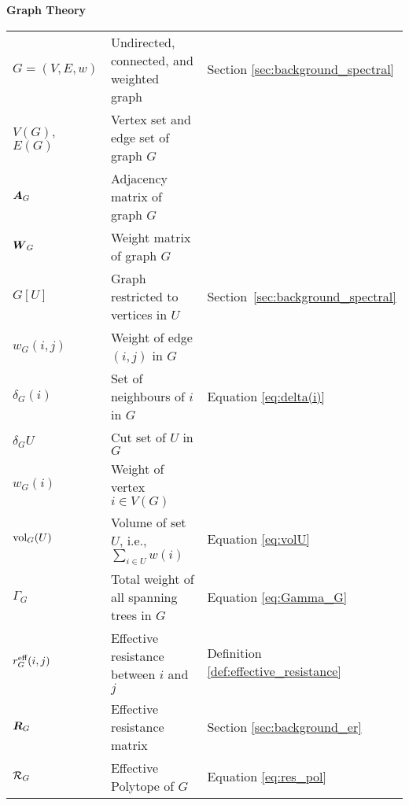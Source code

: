 \noindent \textbf{Graph Theory}\\
\vspace{\headingsep}
\begin{longtable}{p{\colwidth}p{\descsep}l}
	$G=(V,E,w)$ & Undirected, connected, and weighted graph & Section \ref{sec:background_spectral}\\
	$V(G)$, $E(G)$ & Vertex set and edge set of graph $G$\\
	$\vb*{A}_G$ & {Adjacency matrix of graph $G$}\\
	{$\vb*{W}_G$} & {Weight matrix of graph $G$}\\
	$G[U]$ & Graph restricted to vertices in $U$  & Section~\ref{sec:background_spectral}\\
	$w_G(i,j)$ & Weight of edge $(i,j)$ in $G$ \\
	$\delta_G(i)$ & Set of neighbours of $i$ in $G$ & Equation \eqref{eq:delta(i)}\\
	$\delta_G U$ & Cut set of $U$ in $G$ \\
	$w_G(i)$ & Weight of vertex $i\in V(G)$\\
	$\textnormal{vol}_G(U)$ & Volume of set $U$, i.e., $\sum_{i\in U}w(i)$ & Equation \eqref{eq:volU}\\
	$\Gamma_G$ & Total weight of all spanning trees in $G$ & Equation \eqref{eq:Gamma_G} \\
	$r^{\text{eff}}_G(i,j)$  & Effective resistance between $i$ and $j$ & Definition \ref{def:effective_resistance}\\
	$\vb*{R}_G$  & Effective resistance matrix & Section \ref{sec:background_er}\\
	$\mathcal{R}_G$ & Effective Polytope of $G$ & Equation \eqref{eq:res_pol}
\end{longtable}
\vspace{\groupsep}


